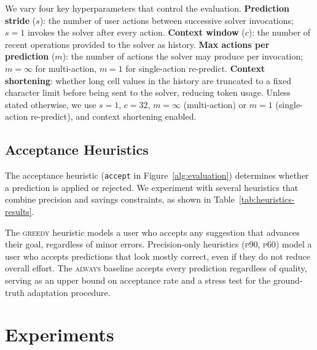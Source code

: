 \documentclass{article}
\theoremstyle{plain}
\theoremstyle{definition}
\theoremstyle{remark}
\begin{document}
We vary four key hyperparameters that control the evaluation.
\textbf{Prediction stride} ($s$): the number of user actions between successive solver invocations; $s{=}1$ invokes the solver after every action.
\textbf{Context window} ($c$): the number of recent operations provided to the solver as history.
\textbf{Max actions per prediction} ($m$): the number of actions the solver may produce per invocation; $m{=}\infty$ for multi-action, $m=1$ for single-action re-predict.
\textbf{Context shortening}: whether long cell values in the history are truncated to a fixed character limit before being sent to the solver, reducing token usage.
Unless stated otherwise, we use $s=1$, $c=32$, $m=\infty$ (multi-action) or $m=1$ (single-action re-predict), and context shortening enabled.

\subsection{Acceptance Heuristics}

The acceptance heuristic (\texttt{accept} in Figure~\ref{alg:evaluation}) determines whether a prediction is applied or rejected.
We experiment with several heuristics that combine precision and savings constraints, as shown in Table~\ref{tab:heuristics-results}.


The \textsc{greedy} heuristic models a user who accepts any suggestion that advances their goal, regardless of minor errors.
Precision-only heuristics (\textsc{p90}, \textsc{p60}) model a user who accepts predictions that look mostly correct, even if they do not reduce overall effort.
The \textsc{always} baseline accepts every prediction regardless of quality, serving as an upper bound on acceptance rate and a stress test for the ground-truth adaptation procedure.

\section{Experiments}\label{sec:experiments}
\end{document}
